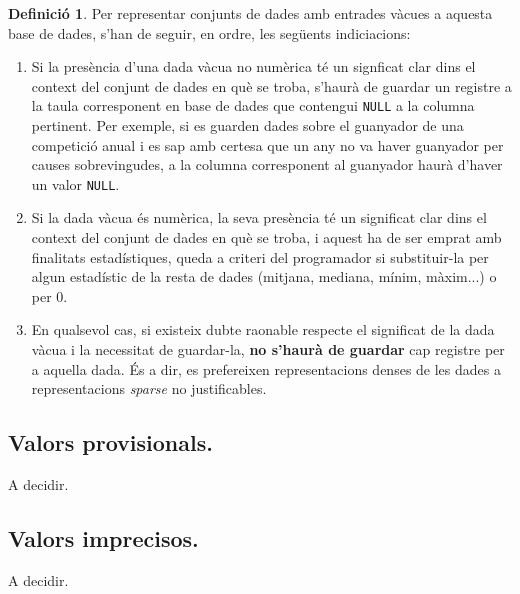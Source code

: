 \documentclass{article}
\theoremstyle{definition}
\newtheorem{definition}{Definició}
\begin{document}
\begin{definition}
  Per representar conjunts de dades amb entrades vàcues a aquesta base de dades, s'han de seguir, en ordre, les següents indiciacions:
  \begin{enumerate}
    \item Si la presència d'una dada vàcua no numèrica té un signficat clar dins el context del conjunt de dades en què se troba, s'haurà de guardar un registre a la taula corresponent en base de dades que contengui \verb|NULL| a la columna pertinent. Per exemple, si es guarden dades sobre el guanyador de una competició anual i es sap amb certesa que un any no va haver guanyador per causes sobrevingudes, a la columna corresponent al guanyador haurà d'haver un valor \verb|NULL|.
    \item Si la dada vàcua és numèrica, la seva presència té un significat clar dins el context del conjunt de dades en què se troba, i aquest ha de ser emprat amb finalitats estadístiques, queda a criteri del programador si substituir-la per algun estadístic de la resta de dades (mitjana, mediana, mínim, màxim...) o per \(0\).
    \item En qualsevol cas, si existeix dubte raonable respecte el significat de la dada vàcua i la necessitat de guardar-la, \textbf{no s'haurà de guardar} cap registre per a aquella dada. És a dir, es prefereixen representacions denses de les dades a representacions \textit{sparse} no justificables.
  \end{enumerate}
\end{definition}

\subsection{Valors provisionals.}

A decidir.

\subsection{Valors imprecisos.}

A decidir.
\end{document}
